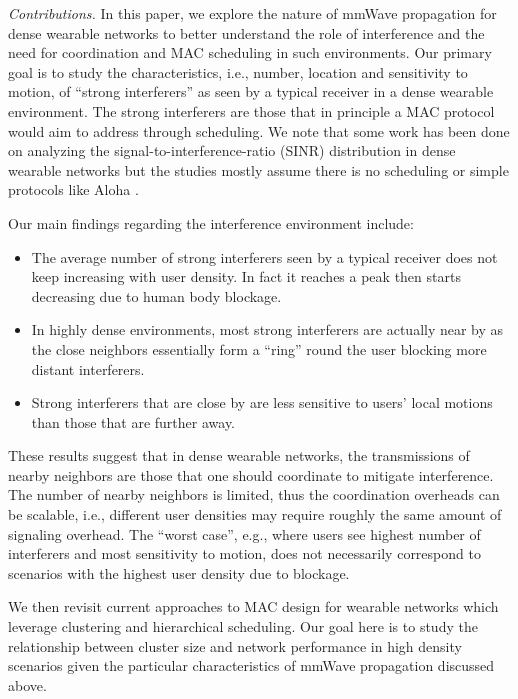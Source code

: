 \documentclass[10pt, conference, letterpaper]{IEEEtran}
\begin{document}
\emph{Contributions.}
In this paper, we explore the nature of mmWave propagation for dense wearable networks to better understand the role of interference and the need for coordination and MAC scheduling in such environments. 
Our primary goal is to study the characteristics, i.e., number, location and sensitivity to motion, of ``strong interferers'' as seen by a typical receiver in a dense wearable environment. 
The strong interferers are those that in principle a MAC protocol would aim to address through scheduling. 
We note that some work has been done on analyzing the signal-to-interference-ratio (SINR) distribution in dense wearable networks but the studies mostly assume there is no scheduling or simple protocols like Aloha \cite{interferencefinitesized}\cite{enclosedmmwave}.

Our main findings regarding the interference environment include: 
\begin{itemize}
	\item The average number of strong interferers seen by a typical receiver does not keep increasing with user density. 
	In fact it reaches a peak then starts decreasing due to human body blockage. 
	\item In highly dense environments, most strong interferers are actually near by as the close neighbors essentially form a ``ring'' round the user blocking more distant interferers. 
	\item Strong interferers that are close by are less sensitive to users' local motions than those that are further away. 
\end{itemize}

These results suggest that in dense wearable networks, the transmissions of nearby neighbors are those that one should coordinate to mitigate interference.  
The number of nearby neighbors is limited, thus the coordination overheads can be scalable, i.e., different user densities may require roughly the same amount of signaling overhead. 
The ``worst case'', e.g., where users see highest number of interferers and most sensitivity to motion, does not necessarily correspond to scenarios with the highest user density due to blockage.

We then revisit current approaches to MAC design for wearable networks which leverage clustering and hierarchical scheduling. 
Our goal here is to study the relationship between cluster size and network performance in high density scenarios given the particular characteristics of mmWave propagation discussed above. 
\end{document}

